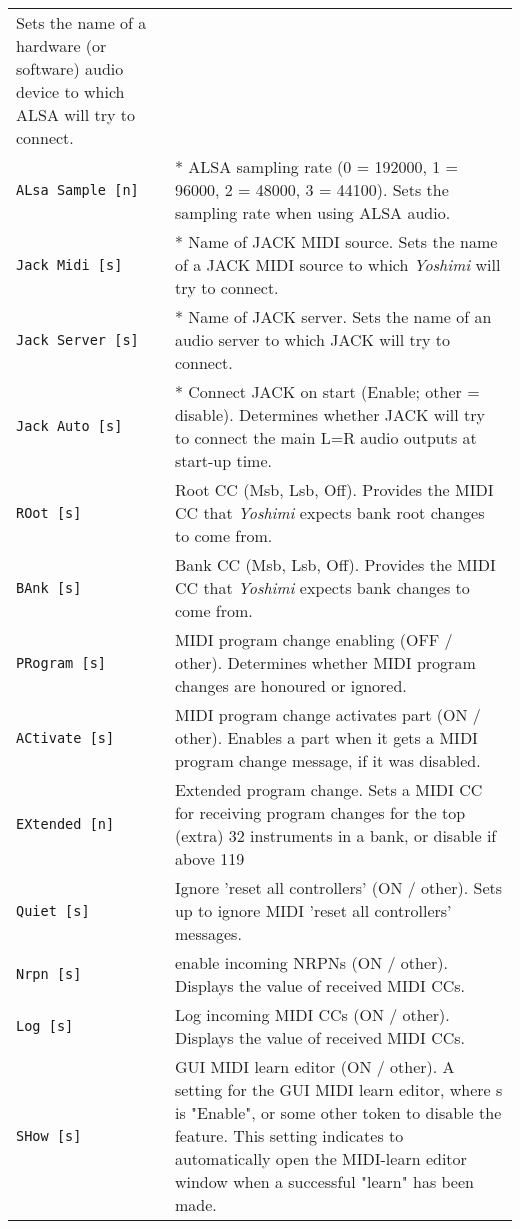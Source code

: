 \begin{center}
\begin{longtable}{p{4cm} p{10cm}}
   Sets the name of a hardware (or software)
   audio device to which ALSA will try to connect.  \\
\texttt{ALsa Sample [n]} &
   * ALSA sampling rate (0 = 192000, 1 = 96000, 2 = 48000, 3 = 44100).
   Sets the sampling rate when using ALSA audio. \\
\texttt{Jack Midi [s]} &
   * Name of JACK MIDI source.
   Sets the name of a JACK MIDI source to which
   \textsl{Yoshimi} will try to connect.  \\
\texttt{Jack Server [s]} &
   * Name of JACK server.
   Sets the name of an audio server to which JACK will try to connect. \\
\texttt{Jack Auto [s]} &
   * Connect JACK on start (Enable; other = disable).
   Determines whether JACK will try to connect the main L=R audio outputs at
   start-up time. \\
\texttt{ROot [s]} &
   Root CC (Msb, Lsb, Off).
   Provides the MIDI CC that \textsl{Yoshimi} expects bank root changes to come
   from.  \\
\texttt{BAnk [s]} &
   Bank CC (Msb, Lsb, Off).
   Provides the MIDI CC that \textsl{Yoshimi} expects
   bank changes to come from.  \\
\texttt{PRogram [s]} &
   MIDI program change enabling (OFF / other).
   Determines whether MIDI program changes are honoured or ignored.  \\
\texttt{ACtivate [s]} &
   MIDI program change activates part (ON / other).
   Enables a part when it gets a MIDI program change message,
   if it was disabled.  \\
\texttt{EXtended [n]} &
   Extended program change.
   Sets a MIDI CC for receiving program changes for the top (extra)
   32 instruments in a bank, or disable if above 119  \\
\texttt{Quiet [s]} &
   Ignore 'reset all controllers' (ON / other).
   Sets up to ignore MIDI 'reset all controllers' messages. \\
\texttt{Nrpn [s]} &
   enable incoming NRPNs (ON / other).
   Displays the value of received MIDI CCs. \\
\texttt{Log [s]} &
   Log incoming MIDI CCs (ON / other).
   Displays the value of received MIDI CCs. \\
\texttt{SHow [s]} &
   GUI MIDI learn editor (ON / other).
   A setting for the GUI MIDI learn editor, where s is "Enable", or some
   other token to disable the feature.
   This setting indicates to automatically open the MIDI-learn editor window
   when a successful "learn" has been made.  \\

\end{longtable}
\end{center}

